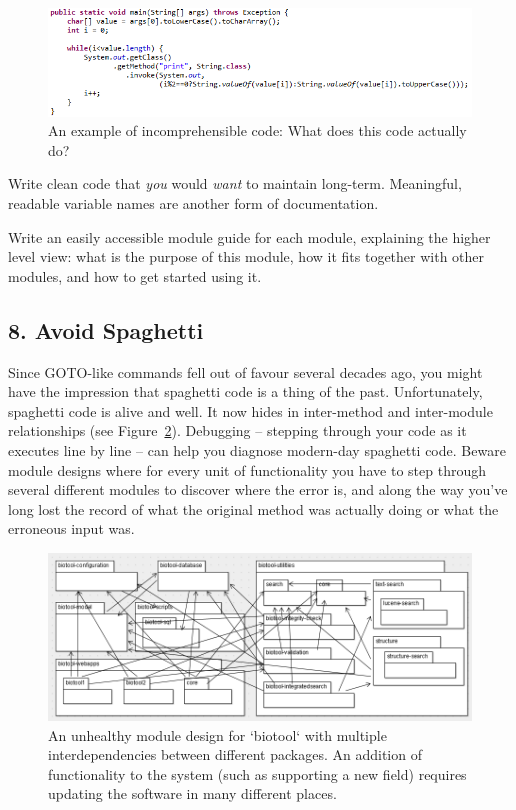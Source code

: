 \documentclass{bmcart}
\begin{document}
\begin{figure}%
\includegraphics[width=\columnwidth]{code-snippet.png}%
\caption{An example of incomprehensible code: What does this code actually do?}%
\label{fig-incomprehensible}%
\end{figure}

Write clean code \cite{cleancode} that \textit{you} would \textit{want} to maintain long-term. Meaningful, readable variable names are another form of documentation. 

Write an easily accessible module guide for each module, explaining the higher level view: what is the purpose of this module, how it fits together with other modules, and how to get started using it. 

\subsection*{8. Avoid Spaghetti}

Since GOTO-like commands fell out of favour several decades ago, you might have the impression that spaghetti code is a thing of the past. Unfortunately, spaghetti code is alive and well. It now hides in inter-method and inter-module relationships (see Figure~\ref{fig-spaghetti}). Debugging -- stepping through your code as it executes line by line -- can help you diagnose modern-day spaghetti code. Beware module designs where for every unit of functionality you have to step through several different modules to discover where the error is, and along the way you've long lost the record of what the original method was actually doing or what the erroneous input was. 

\begin{figure}%
\includegraphics[width=\columnwidth]{ComplexClassDiagram.png}%
\caption{An unhealthy module design for `biotool` with multiple interdependencies between different packages. An addition of functionality to the system (such as supporting a new field) requires updating the software in many different places.}%
\label{fig-spaghetti}%
\end{figure}
\end{document}
